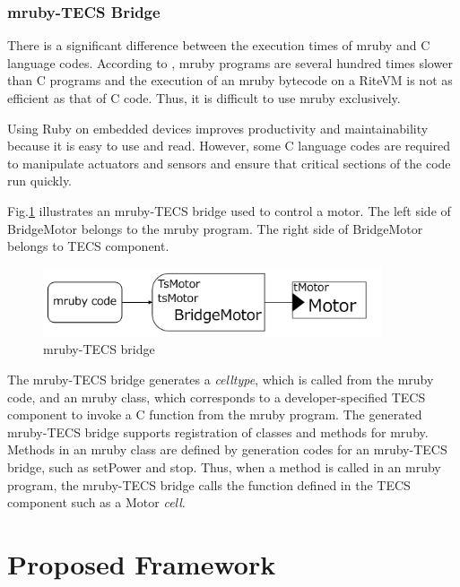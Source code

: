 \documentclass[a4j,12pt,oneside,openany,english]{jsbook}
\begin{document}

\subsection{mruby-TECS Bridge}
There is a significant difference between the execution times of mruby and C language codes.
According to  \cite{par:mrubyonTECS}, mruby programs are several hundred times slower than C programs and the execution of an mruby bytecode on a RiteVM is not as efficient as that of C code.
Thus, it is difficult to use mruby exclusively.

Using Ruby on embedded devices improves productivity and maintainability because it is easy to use and read.
However, some C language codes are required to manipulate actuators and sensors and ensure that critical sections of the code run quickly.

Fig.\ref{fig:mrubyTECSbridge} illustrates an mruby-TECS bridge used to control a motor.
The left side of BridgeMotor belongs to the mruby program.
The right side of BridgeMotor belongs to TECS component.

\begin{figure}[t]
    \centering
    \includegraphics[width=10cm,clip]{figure/mrubyTECSbridge.pdf}
\caption{mruby-TECS bridge}
\label{fig:mrubyTECSbridge}
\end{figure}

The mruby-TECS bridge generates a {\it celltype}, which is called from the mruby code, and an mruby class, which corresponds to a developer-specified TECS component to invoke a C function from the mruby program.
The generated mruby-TECS bridge supports registration of classes and methods for mruby.
Methods in an mruby class are defined by generation codes for an mruby-TECS bridge, such as setPower and stop.
Thus, when a method is called in an mruby program, the mruby-TECS bridge calls the function defined in the TECS component such as a Motor {\it cell}.

\chapter{Proposed Framework}
\label{sec:Proposed Framework}
\end{document}
